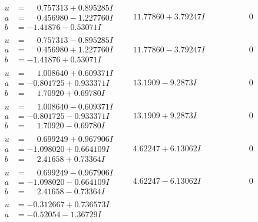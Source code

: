 \documentclass[1p]{elsarticle_modified}
\theoremstyle{definition}
\begin{document}
$$\begin{array}{c|c|c}
 \hline 
\begin{aligned}
u &= \phantom{-}0.757313 + 0.895285 I \\
a &= \phantom{-}0.456980 - 1.227760 I \\
b &= -1.41876 - 0.53071 I\end{aligned}
 & \phantom{-}11.77860 + 3.79247 I & \phantom{-0.000000 } 0 \\ \hline\begin{aligned}
u &= \phantom{-}0.757313 - 0.895285 I \\
a &= \phantom{-}0.456980 + 1.227760 I \\
b &= -1.41876 + 0.53071 I\end{aligned}
 & \phantom{-}11.77860 - 3.79247 I & \phantom{-0.000000 } 0 \\ \hline\begin{aligned}
u &= \phantom{-}1.008640 + 0.609371 I \\
a &= -0.801725 + 0.933371 I \\
b &= \phantom{-}1.70920 + 0.69780 I\end{aligned}
 & \phantom{-}13.1909 - 9.2873 I & \phantom{-0.000000 } 0 \\ \hline\begin{aligned}
u &= \phantom{-}1.008640 - 0.609371 I \\
a &= -0.801725 - 0.933371 I \\
b &= \phantom{-}1.70920 - 0.69780 I\end{aligned}
 & \phantom{-}13.1909 + 9.2873 I & \phantom{-0.000000 } 0 \\ \hline\begin{aligned}
u &= \phantom{-}0.699249 + 0.967906 I \\
a &= -1.098020 + 0.664109 I \\
b &= \phantom{-}2.41658 + 0.73364 I\end{aligned}
 & \phantom{-}4.62247 + 6.13062 I & \phantom{-0.000000 } 0 \\ \hline\begin{aligned}
u &= \phantom{-}0.699249 - 0.967906 I \\
a &= -1.098020 - 0.664109 I \\
b &= \phantom{-}2.41658 - 0.73364 I\end{aligned}
 & \phantom{-}4.62247 - 6.13062 I & \phantom{-0.000000 } 0 \\ \hline\begin{aligned}
u &= -0.312667 + 0.736573 I \\
a &= -0.52054 - 1.36729 I \\

\end{aligned}
\end{array}$$
\end{document}
